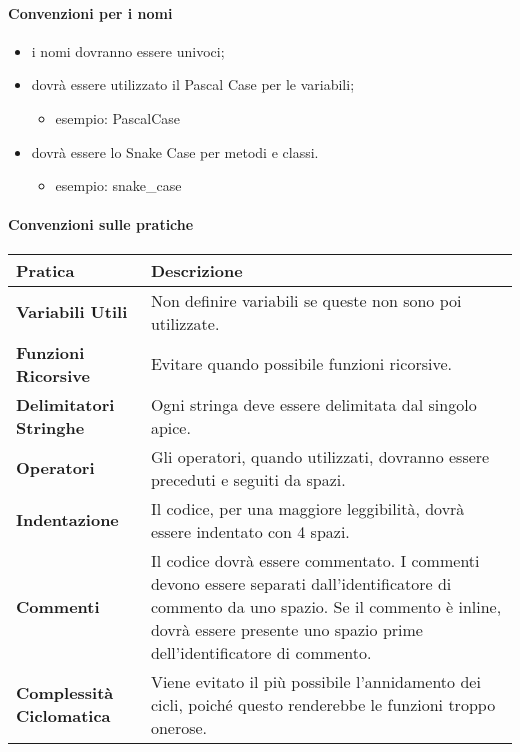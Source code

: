 		\paragraph{Convenzioni per i nomi} 
		\begin{itemize}
			\item i nomi dovranno essere univoci;
			\item dovrà essere utilizzato il Pascal Case per le variabili;
        \begin{itemize}
          \item esempio: PascalCase
        \end{itemize}
			\item dovrà essere lo Snake Case per metodi e classi. 
        \begin{itemize}
          \item esempio: snake\_case
        \end{itemize}
		\end{itemize}
			
		\paragraph{Convenzioni sulle pratiche} \hfill \break
    \newline
		\begin{tabular}{ |m{15em}|m{25em}| }
			\hline
		  \textbf{Pratica}			& \textbf{Descrizione}\\
			\hline
			\textbf{Variabili Utili}		& Non definire variabili se queste non sono poi utilizzate.\\
			\hline
			\textbf{Funzioni Ricorsive}		& Evitare quando possibile funzioni ricorsive.\\
			\hline
			\textbf{Delimitatori Stringhe}	& Ogni stringa deve essere delimitata dal singolo apice.\\
			\hline
			\textbf{Operatori}			& Gli operatori, quando utilizzati, dovranno essere preceduti e seguiti da spazi.\\
			\hline
			\textbf{Indentazione}			& Il codice, per una maggiore leggibilità, dovrà essere indentato con 4 spazi.\\ %
			\hline
			\textbf{Commenti}			& Il codice dovrà essere commentato. I commenti devono essere separati dall'identificatore di commento da uno spazio. Se il commento è inline, dovrà essere presente uno spazio prime dell'identificatore di commento.\\
			\hline
			\textbf{Complessità Ciclomatica}& Viene evitato il più possibile l'annidamento dei cicli, poiché questo renderebbe le funzioni troppo onerose.\\
			\hline
    \end{tabular}
		
